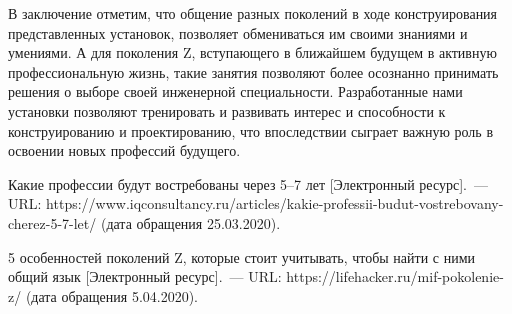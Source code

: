 В заключение отметим, что общение разных поколений в ходе конструирования представленных установок, позволяет обмениваться им своими знаниями и умениями. А для поколения Z, вступающего в ближайшем будущем в активную профессиональную жизнь, такие занятия позволяют более осознанно принимать решения о выборе своей инженерной специальности. Разработанные нами установки позволяют тренировать и развивать интерес и способности к конструированию и проектированию, что впоследствии сыграет важную роль в освоении новых профессий будущего.

\begin{thebibliography}{99}
\bibitem{}\BibAuthor{}Какие профессии будут востребованы через 5--7 лет [Электронный ресурс].~--- URL: https://www.iqconsultancy.ru/articles/kakie-professii-budut-vostrebovany-cherez-5-7-let/ (дата обращения 25.03.2020).

\bibitem{}\BibAuthor{}5 особенностей поколений Z, которые стоит учитывать, чтобы найти с ними общий язык [Электронный ресурс].~--- URL: https://lifehacker.ru/mif-pokolenie-z/ (дата обращения 5.04.2020).
\end{thebibliography}
